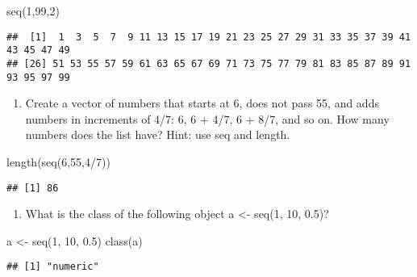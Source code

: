 \documentclass[
]{article}
\newenvironment{Shaded}{\begin{snugshade}}{\end{snugshade}}
\newcommand{\DecValTok}[1]{\textcolor[rgb]{0.00,0.00,0.81}{#1}}
\newcommand{\FloatTok}[1]{\textcolor[rgb]{0.00,0.00,0.81}{#1}}
\newcommand{\FunctionTok}[1]{\textcolor[rgb]{0.00,0.00,0.00}{#1}}
\newcommand{\NormalTok}[1]{#1}
\newcommand{\OtherTok}[1]{\textcolor[rgb]{0.56,0.35,0.01}{#1}}
\newcommand{\SpecialCharTok}[1]{\textcolor[rgb]{0.00,0.00,0.00}{#1}}
\providecommand{\tightlist}{%
  \setlength{\itemsep}{0pt}\setlength{\parskip}{0pt}}
\begin{document}
\begin{Shaded}
\begin{Highlighting}[]
\FunctionTok{seq}\NormalTok{(}\DecValTok{1}\NormalTok{,}\DecValTok{99}\NormalTok{,}\DecValTok{2}\NormalTok{)}
\end{Highlighting}
\end{Shaded}

\begin{verbatim}
##  [1]  1  3  5  7  9 11 13 15 17 19 21 23 25 27 29 31 33 35 37 39 41 43 45 47 49
## [26] 51 53 55 57 59 61 63 65 67 69 71 73 75 77 79 81 83 85 87 89 91 93 95 97 99
\end{verbatim}

\begin{enumerate}
\def\labelenumi{\arabic{enumi}.}
\setcounter{enumi}{7}
\tightlist
\item
  Create a vector of numbers that starts at 6, does not pass 55, and
  adds numbers in increments of 4/7: 6, 6 + 4/7, 6 + 8/7, and so on. How
  many numbers does the list have? Hint: use seq and length.
\end{enumerate}

\begin{Shaded}
\begin{Highlighting}[]
\FunctionTok{length}\NormalTok{(}\FunctionTok{seq}\NormalTok{(}\DecValTok{6}\NormalTok{,}\DecValTok{55}\NormalTok{,}\DecValTok{4}\SpecialCharTok{/}\DecValTok{7}\NormalTok{))}
\end{Highlighting}
\end{Shaded}

\begin{verbatim}
## [1] 86
\end{verbatim}

\begin{enumerate}
\def\labelenumi{\arabic{enumi}.}
\setcounter{enumi}{8}
\tightlist
\item
  What is the class of the following object a \textless- seq(1, 10,
  0.5)?
\end{enumerate}

\begin{Shaded}
\begin{Highlighting}[]
\NormalTok{a }\OtherTok{\textless{}{-}} \FunctionTok{seq}\NormalTok{(}\DecValTok{1}\NormalTok{, }\DecValTok{10}\NormalTok{, }\FloatTok{0.5}\NormalTok{)}
\FunctionTok{class}\NormalTok{(a)}
\end{Highlighting}
\end{Shaded}

\begin{verbatim}
## [1] "numeric"
\end{verbatim}
\end{document}
